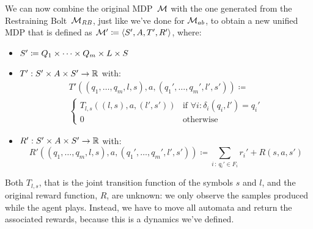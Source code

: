 We can now combine the original MDP~$\mathcal{M}$ with the one generated from the
Restraining Bolt~$\mathcal{M}_{\text{\textit{RB}}}$, just like we've done for $\mathcal{M}_{ab}$,
to obtain a new unified MDP that is defined as $\mathcal{M}' \coloneqq \langle S',
A, T', R' \rangle$, where:
\begin{itemize}
	\item $S' \coloneqq Q_1 \times \dots \times Q_m \times L \times S$
	\item $T' : S' \times A \times S' \to \mathbb{R}$ with:
		\begin{multline*}
			T'((q_1, \dots, q_m, l, s), a, (q_1', \dots, q_m', l', s')) \coloneqq \\
			\begin{cases}
				T_{l,s}((l,s), a, (l',s')) &
					\text{if $\forall i : \delta_i(q_i, l') = q_i'$} \\
				0 & \text{otherwise}
			\end{cases}
		\end{multline*}
	\item $R' : S' \times A \times S' \to \mathbb{R}$ with:
		\[
			R'((q_1, \dots, q_m, l, s), a, (q_1', \dots, q_m', l', s')) \coloneqq
			\sum_{i\, :\, q_i' \in F_i} r_i' + R(s, a, s')
		\]
\end{itemize}
Both $T_{l,s}$, that is the joint transition function of the symbols $s$ and
$l$, and the original reward function, $R$, are unknown: we only observe the
samples produced while the agent plays. Instead, we have to move all
automata and return the associated rewards, because this is a dynamics we've
defined.

